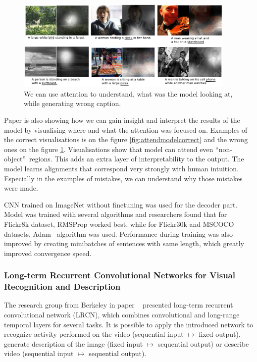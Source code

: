 \begin{figure}[!t]
	\centering
	\includegraphics[width=0.95\textwidth]{./fig/show-attend-tell_example-wrong.pdf}
	\caption{We can use attention to understand, what was the model looking at, while generating wrong caption.~\cite{DBLP:journals/corr/XuBKCCSZB15}
		\label{fig:attendmodelwrong}}
\end{figure}

Paper is also showing how we can gain insight and interpret the results of the model by visualising where and what the attention was focused on. Examples of the correct visualisations is on the figure \ref{fig:attendmodelcorrect} and the wrong ones on the figure \ref{fig:attendmodelwrong}. Visualisations show that model can attend even \textquotedblleft non-object\textquotedblright\ regions. This adds an extra layer of interpretability to the output. The model learns alignments that correspond very strongly with human intuition. Especially in the examples of mistakes, we can understand why those mistakes were made.

CNN trained on ImageNet without finetuning was used for the decoder part. Model was trained with several algorithms and researchers found that for Flickr8k dataset, RMSProp worked best, while for Flickr30k and MSCOCO datasets, Adam~\cite{DBLP:journals/corr/KingmaB14} algorithm was used. Performance during training was also improved by creating minibatches of sentences with same length, which greatly improved convergence speed.

		\subsubsection{Long-term Recurrent Convolutional Networks for Visual Recognition and Description}

The research group from Berkeley in paper ~\cite{DBLP:journals/corr/DonahueHGRVSD14} presented long-term recurrent convolutional network (LRCN), which combines convolutional and long-range temporal layers for several tasks. It is possible to apply the introduced network to recognize activity performed on the video (sequential input $ \mapsto $ fixed output), generate description  of the image (fixed input $ \mapsto $ sequential output) or describe video (sequential input $ \mapsto $ sequential output).


